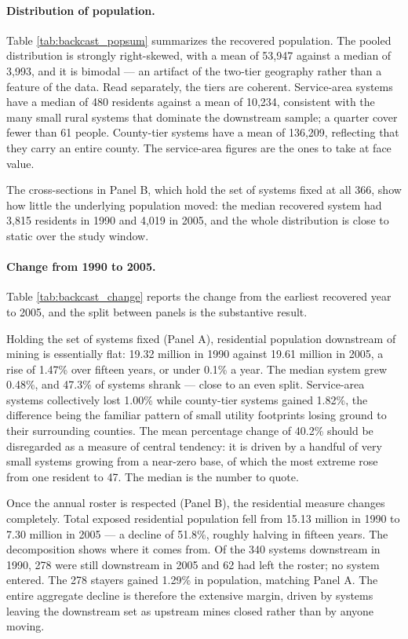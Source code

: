 \paragraph{Distribution of population.}
Table \ref{tab:backcast_popsum} summarizes the recovered population. The pooled
distribution is strongly right-skewed, with a mean of 53,947 against a median of
3,993, and it is bimodal --- an artifact of the two-tier geography rather than a
feature of the data. Read separately, the tiers are coherent. Service-area
systems have a median of 480 residents against a mean of 10,234, consistent with
the many small rural systems that dominate the downstream sample; a quarter cover
fewer than 61 people. County-tier systems have a mean of 136,209, reflecting that
they carry an entire county. The service-area figures are the ones to take at
face value.

The cross-sections in Panel B, which hold the set of systems fixed at all 366,
show how little the underlying population moved: the median recovered system had
3,815 residents in 1990 and 4,019 in 2005, and the whole distribution is close to
static over the study window.



\paragraph{Change from 1990 to 2005.}
Table \ref{tab:backcast_change} reports the change from the earliest recovered
year to 2005, and the split between panels is the substantive result.

Holding the set of systems fixed (Panel A), residential population downstream of
mining is essentially flat: 19.32 million in 1990 against 19.61 million in 2005,
a rise of 1.47\% over fifteen years, or under 0.1\% a year. The median system
grew 0.48\%, and 47.3\% of systems shrank --- close to an even split. Service-area
systems collectively lost 1.00\% while county-tier systems gained 1.82\%, the
difference being the familiar pattern of small utility footprints losing ground
to their surrounding counties. The mean percentage change of 40.2\% should be
disregarded as a measure of central tendency: it is driven by a handful of very
small systems growing from a near-zero base, of which the most extreme rose from
one resident to 47. The median is the number to quote.

Once the annual roster is respected (Panel B), the residential measure changes
completely. Total exposed residential population fell from 15.13 million in 1990
to 7.30 million in 2005 --- a decline of 51.8\%, roughly halving in fifteen years.
The decomposition shows where it comes from. Of the 340 systems downstream in
1990, 278 were still downstream in 2005 and 62 had left the roster; no system
entered. The 278 stayers gained 1.29\% in population, matching Panel A. The
entire aggregate decline is therefore the extensive margin, driven by systems
leaving the downstream set as upstream mines closed rather than by anyone moving.

